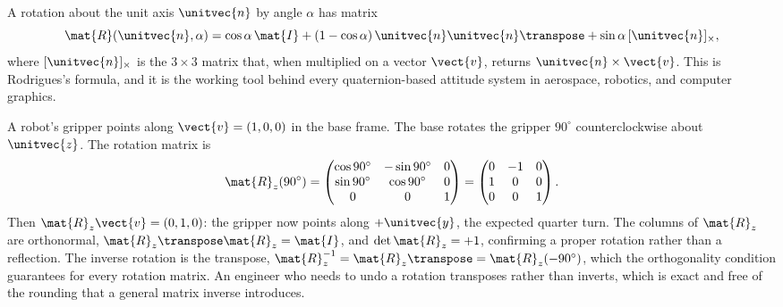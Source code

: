 A rotation about the unit axis $\unitvec{n}$ by angle $\alpha$ has
matrix
\[
\mat{R}(\unitvec{n}, \alpha) = \cos\alpha \,\mat{I} + (1 - \cos\alpha)
\,\unitvec{n}\unitvec{n}\transpose + \sin\alpha \,[\unitvec{n}]_{\times},
\]
where $[\unitvec{n}]_{\times}$ is the $3 \times 3$ matrix that, when
multiplied on a vector $\vect{v}$, returns $\unitvec{n} \times
\vect{v}$. This is Rodrigues's formula, and it is the working tool
behind every quaternion-based attitude system in aerospace, robotics,
and computer graphics.

\begin{example}
A robot's gripper points along $\vect{v} = (1, 0, 0)$ in the base
frame. The base rotates the gripper $90^{\circ}$ counterclockwise
about $\unitvec{z}$. The rotation matrix is
\[
\mat{R}_{z}(90^{\circ}) =
\begin{pmatrix}
\cos 90^{\circ} & -\sin 90^{\circ} & 0 \\
\sin 90^{\circ} & \cos 90^{\circ} & 0 \\
0 & 0 & 1
\end{pmatrix}
=
\begin{pmatrix}
0 & -1 & 0 \\
1 & 0 & 0 \\
0 & 0 & 1
\end{pmatrix}.
\]
Then $\mat{R}_{z}\vect{v} = (0, 1, 0)$: the gripper now points along
$+\unitvec{y}$, the expected quarter turn. The columns of
$\mat{R}_{z}$ are orthonormal, $\mat{R}_{z}\transpose\mat{R}_{z} =
\mat{I}$, and $\det\mat{R}_{z} = +1$, confirming a proper rotation
rather than a reflection. The inverse rotation is the transpose,
$\mat{R}_{z}^{-1} = \mat{R}_{z}\transpose = \mat{R}_{z}(-90^{\circ})$,
which the orthogonality condition guarantees for every rotation
matrix. An engineer who needs to undo a rotation transposes rather
than inverts, which is exact and free of the rounding that a general
matrix inverse introduces.
\end{example}

